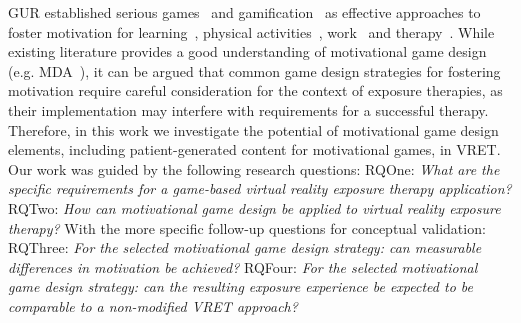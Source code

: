 \ac{GUR} established serious games~\cite{abt1970} and gamification~\cite{deterding2011} as effective approaches to foster motivation for learning~\cite{breuer2010,connolly2012, denny2018}, physical activities~\cite{barathi2018,smeddinck2014}, work~\cite{dale2014, hamari2014a} and therapy~\cite{garcia-palacios2007, mandryk2017,smeddinck2015,smeddinck2016}.
While existing literature provides a good understanding of motivational game design (e.g. MDA~\cite{hunicke2004}), it can be argued that common game design strategies for fostering motivation require careful consideration for the context of exposure therapies, as their implementation may interfere with requirements for a successful therapy.
Therefore, in this work we investigate the potential of motivational game design elements, including patient-generated content for motivational games, in \ac{VRET}. Our work was guided by the following research questions:
\newline
\acl{RQOne}: \textit{What are the specific requirements for a game-based virtual reality exposure therapy application?}
\newline
\acl{RQTwo}: \textit{How can motivational game design be applied to virtual reality exposure therapy?}
\newline
With the more specific follow-up questions for conceptual validation:
\newline
\acl{RQThree}: \textit{For the selected motivational game design strategy: can measurable differences in motivation be achieved?}
\newline
\acl{RQFour}: \textit{For the selected motivational game design strategy: can the resulting exposure experience be expected to be comparable to a non-modified \ac{VRET} approach?}
\newline


